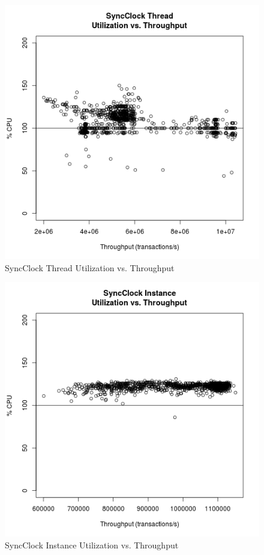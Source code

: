 \begin{figure}
\center
\includegraphics[height=.4\textheight]{sync_thread_throughput_utilization.png}
\caption{SyncClock Thread Utilization vs. Throughput}
\label{sync_thread_throughput_utilization}
\end{figure}

\begin{figure}
\center
\includegraphics[height=.4\textheight]{sync_instance_throughput_utilization.png}
\caption{SyncClock Instance Utilization vs. Throughput}
\label{sync_instance_throughput_utilization}
\end{figure}

